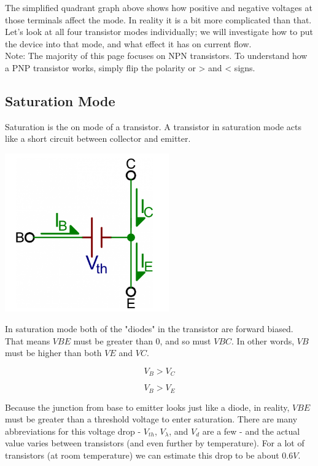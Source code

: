 \documentclass[a4paper, 11pt]{article} %
\begin{document}
The simplified quadrant graph above shows how positive and negative voltages at those terminals affect the mode. In reality it is a bit more complicated than that.\\

Let's look at all four transistor modes individually; we will investigate how to put the device into that mode, and what effect it has on current flow.\\

Note: The majority of this page focuses on NPN transistors. To understand how a PNP transistor works, simply flip the polarity or > and < signs.\\

\subsection*{Saturation Mode}

Saturation is the on mode of a transistor. A transistor in saturation mode acts like a short circuit between collector and emitter.

\begin{center}
\includegraphics[width=200pt]{tran11}
\end{center}

In saturation mode both of the "diodes" in the transistor are forward biased. That means $VBE$ must be greater than 0, and so must $VBC$. In other words, $VB$ must be higher than both $VE$ and $VC$.

$$V_{B} > V_{C}$$

$$V_{B} > V_{E}$$

Because the junction from base to emitter looks just like a diode, in reality, $VBE$ must be greater than a threshold voltage to enter saturation. There are many abbreviations for this voltage drop - $V_{th}$, $V_{\lambda}$, and $V_{d}$ are a few - and the actual value varies between transistors (and even further by temperature). For a lot of transistors (at room temperature) we can estimate this drop to be about $0.6V$.\\
\end{document}

